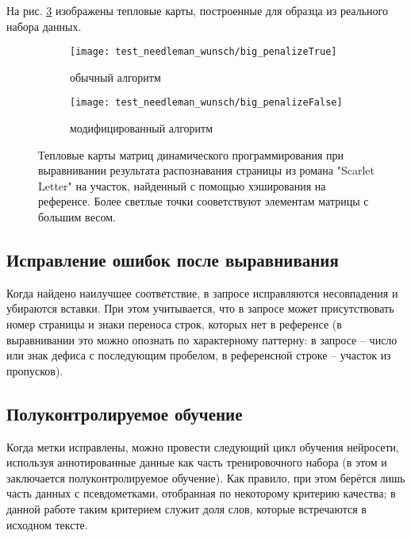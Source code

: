 \documentclass{main.tex}[subfiles]
\begin{document}
На рис. \ref{fig:needleman_real} изображены тепловые карты, построенные для образца из реального набора данных. %

\begin{figure}[H]
    \centering
    \begin{subfigure}{.5\textwidth}
        \centering
        \texttt{[image: test\_needleman\_wunsch/big\_penalizeTrue]}
        \caption{обычный алгоритм}
        \label{fig:needleman_real:usual}
    \end{subfigure}%
    \begin{subfigure}{.5\textwidth}
        \centering
        \texttt{[image: test\_needleman\_wunsch/big\_penalizeFalse]}
        \caption{модифицированный алгоритм}
        \label{fig:needleman_real:modified}
    \end{subfigure}
    \caption{Тепловые карты матриц динамического программирования при выравнивании результата распознавания страницы из романа "Scarlet Letter"\hspace{0pt} на участок, найденный с помощью хэширования на референсе.
    Более светлые точки сооветствуют элементам матрицы с большим весом.}
    \label{fig:needleman_real}
\end{figure}


\subsection{Исправление ошибок после выравнивания}

Когда найдено наилучшее соответствие, в запросе исправляются несовпадения и убираются вставки.
При этом учитывается, что в запросе может присутствовать номер страницы и знаки переноса строк, которых нет в референсе (в выравнивании это можно опознать по характерному паттерну: в запросе -- число или знак дефиса с последующим пробелом, в референсной строке -- участок из пропусков).

\subsection{Полуконтролируемое обучение}

Когда метки исправлены, можно провести следующий цикл обучения нейросети, используя аннотированные данные как часть тренировочного набора (в этом и заключается полуконтролируемое обучение).
Как правило, при этом берётся лишь часть данных с псевдометками, отобранная по некоторому критерию качества; в данной работе таким критерием служит доля слов, которые встречаются в исходном тексте.
\end{document}
